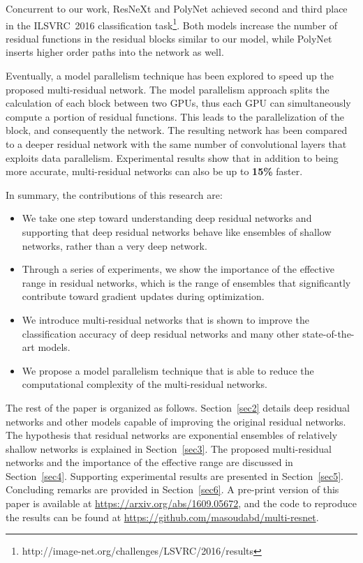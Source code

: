 \documentclass[journal]{IEEEtran}
\begin{document}
Concurrent to our work, ResNeXt \cite{xie2016aggregated} and PolyNet \cite{zhang2016polynet} achieved second and third place in the ILSVRC~2016 classification task\footnote{http://image-net.org/challenges/LSVRC/2016/results}. Both models increase the number of residual functions in the residual blocks similar to our model, while PolyNet inserts higher order paths into the network as well. 

Eventually, a model parallelism technique has been explored to speed up the proposed multi-residual network. The model parallelism approach splits the calculation of each block between two GPUs, thus each GPU can simultaneously compute a portion of residual functions. This leads to the parallelization of the block, and consequently the network. The resulting network has been compared to a deeper residual network with the same number of convolutional layers that exploits data parallelism. Experimental results show that in addition to being more accurate, multi-residual networks can also be up to \textbf{15\%} faster.



In summary, the contributions of this research are:
\begin{itemize}
\item We take one step toward understanding deep residual networks and supporting that deep residual networks behave like ensembles of shallow networks, rather than a very deep network.

\item Through a series of experiments, we show the importance of the effective range in residual networks, which is the range of ensembles that significantly contribute toward gradient updates during optimization.

\item We introduce multi-residual networks that is shown to improve the classification accuracy of deep residual networks and many other state-of-the-art models.

\item We propose a model parallelism technique that is able to reduce the computational complexity of the multi-residual networks.

\end{itemize}


The rest of the paper is organized as follows. Section~\ref{sec2} details deep residual networks and other models capable of improving the original residual networks. The hypothesis that residual networks are exponential ensembles of relatively shallow networks is explained in Section~\ref{sec3}. The proposed multi-residual networks and the importance of the effective range are discussed in Section~\ref{sec4}.  Supporting experimental results are presented in Section~\ref{sec5}. Concluding remarks are provided in Section~\ref{sec6}. A pre-print version of this paper \cite{mine} is available at \url{https://arxiv.org/abs/1609.05672}, and the code to reproduce the results can be found at \url{https://github.com/masoudabd/multi-resnet}.
\end{document}
